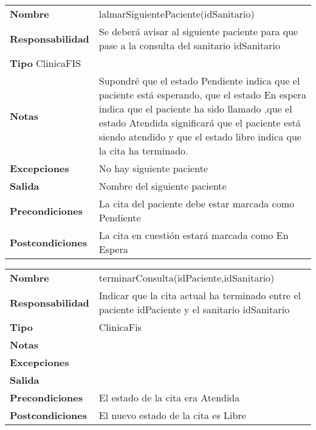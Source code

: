 \documentclass[11pt]{article}
\begin{document}
\begin{table}[htbp]
	  \begin{tabularx}{\textwidth}{l|l}
    \textbf{Nombre}        & lalmarSiguientePaciente(idSanitario) \\ 
    \textbf{Responsabilidad}  &  Se deberá avisar al siguiente paciente para que pase a la consulta del sanitario idSanitario \\ 
    \textbf{Tipo}  ClinicaFIS      &  \\ 
    \textbf{Notas}        & Supondré que el estado Pendiente indica que el paciente está esperando, que el estado En espera indica que el paciente ha sido llamado ,que el estado Atendida significará que el paciente está siendo atendido y que el estado libre indica que la cita ha terminado.  \\ 
    \textbf{Excepciones}    & No hay siguiente paciente \\ 
    \textbf{Salida}        & Nombre del siguiente paciente\\ 
    \textbf{Precondiciones}    & La cita del paciente debe estar marcada como Pendiente \\ 
    \textbf{Postcondiciones}  & La cita en cuestión estará marcada como En Espera \\ 
  \end{tabularx}

\end{table}


\begin{table}[htbp]
	  \begin{tabularx}{\textwidth}{l|l}
    \textbf{Nombre}        & terminarConsulta(idPaciente,idSanitario) \\ 
    \textbf{Responsabilidad}  & Indicar que la cita actual ha terminado entre el paciente idPaciente y el sanitario idSanitario \\ 
    \textbf{Tipo}        &  ClinicaFis\\ 
    \textbf{Notas}        &  \\ 
    \textbf{Excepciones}    &  \\ 
    \textbf{Salida}        &  \\ 
    \textbf{Precondiciones}    & El estado de la cita era Atendida  \\ 
    \textbf{Postcondiciones}  & El nuevo estado de la cita es Libre\\ 
  \end{tabularx}

\end{table}
\end{document}
